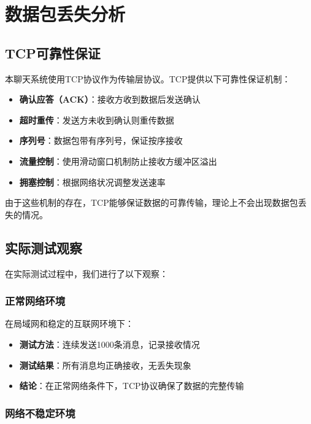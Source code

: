 \documentclass[12pt, a4paper]{article}
\begin{document}
\section{数据包丢失分析}

\subsection{TCP可靠性保证}

本聊天系统使用TCP协议作为传输层协议。TCP提供以下可靠性保证机制：

\begin{itemize}[itemsep=3pt]
  \item \textbf{确认应答（ACK）}：接收方收到数据后发送确认
  \item \textbf{超时重传}：发送方未收到确认则重传数据
  \item \textbf{序列号}：数据包带有序列号，保证按序接收
  \item \textbf{流量控制}：使用滑动窗口机制防止接收方缓冲区溢出
  \item \textbf{拥塞控制}：根据网络状况调整发送速率
\end{itemize}

由于这些机制的存在，TCP能够保证数据的可靠传输，理论上不会出现数据包丢失的情况。

\subsection{实际测试观察}

在实际测试过程中，我们进行了以下观察：

\subsubsection{正常网络环境}

在局域网和稳定的互联网环境下：

\begin{itemize}[itemsep=3pt]
  \item \textbf{测试方法}：连续发送1000条消息，记录接收情况
  \item \textbf{测试结果}：所有消息均正确接收，无丢失现象
  \item \textbf{结论}：在正常网络条件下，TCP协议确保了数据的完整传输
\end{itemize}

\subsubsection{网络不稳定环境}
\end{document}
